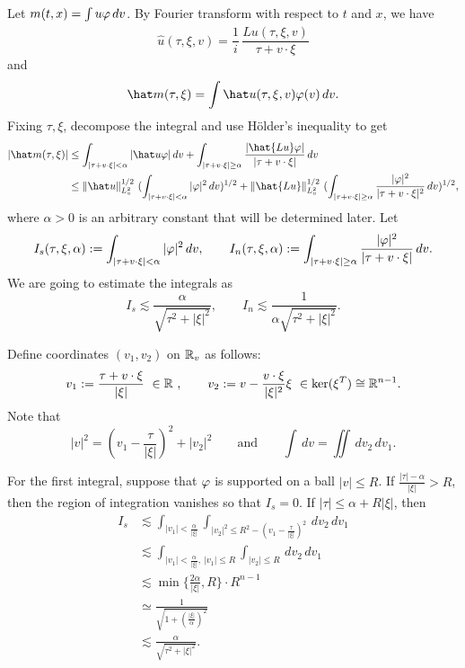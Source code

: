 \documentclass[a4paper]{article}
\begin{document}
\begin{pf}
Let $m(t,x)=\int u\varphi\,dv$.
By Fourier transform with respect to $t$ and $x$, we have
\[\hat u(\tau,\xi,v)=\frac1i\,\frac{\hat{Lu}(\tau,\xi,v)}{\tau+v\cdot\xi}\]
and
\[\hat m(\tau,\xi)=\int\hat u(\tau,\xi,v)\f(v)\,dv.\]
Fixing $\tau,\xi$, decompose the integral and use H\"older's inequality to get
\begin{align*}
|\hat m(\tau,\xi)|
&\le\int_{|\tau+v\cdot\xi|<\alpha}|\hat u\f|\,dv+\int_{|\tau+v\cdot\xi|\ge\alpha}\frac{|\hat{Lu}\f|}{|\tau+v\cdot\xi|}\,dv\\
&\le\|\hat u\|_{L_v^2}^{1/2}\ (\int_{|\tau+v\cdot\xi|<\alpha}|\f|^2\,dv)^{1/2}+\|\hat{Lu}\|_{L_v^2}^{1/2}\ (\int_{|\tau+v\cdot\xi|\ge\alpha}\frac{|\f|^2}{|\tau+v\cdot\xi|^2}\,dv)^{1/2},
\end{align*}
where $\alpha>0$ is an arbitrary constant that will be determined later.
Let
\[I_s(\tau,\xi,\alpha):=\int_{|\tau+v\cdot\xi|<\alpha}|\varphi|^2\,dv,\qquad
I_n(\tau,\xi,\alpha):=\int_{|\tau+v\cdot\xi|\ge\alpha}\frac{|\varphi|^2}{|\tau+v\cdot\xi|}\,dv.\]
We are going to estimate the integrals as
\[I_s\lesssim\frac{\alpha}{\sqrt{\tau^2+|\xi|^2}},\qquad
I_n\lesssim\frac1{\alpha\sqrt{\tau^2+|\xi|^2}}.\]

Define coordinates $(v_1,v_2)$ on $\mathbb{R}_v$ as follows:
\[v_1:=\frac{\tau+v\cdot\xi}{|\xi|}\ \in\R\ ,\qquad v_2:=v-\frac{v\cdot\xi}{|\xi|^2}\xi\ \in\ker(\xi^T)\cong\R^{n-1}.\]
Note that
\[|v|^2=(v_1-\frac\tau{|\xi|})^2+|v_2|^2\qquad\text{and}\qquad\int\,dv=\iint\,dv_2\,dv_1.\]

For the first integral, suppose that $\varphi$ is supported on a ball $|v|\le R$.
If $\frac{|\tau|-\alpha}{|\xi|}>R$, then the region of integration vanishes so that $I_s=0$.
If $|\tau|\le\alpha+R|\xi|$, then
\begin{align*}
I_s&\lesssim\int_{|v_1|<\frac\alpha{|\xi|}}\int_{|v_2|^2\le R^2-(v_1-\frac\tau{|\xi|})^2}\,dv_2\,dv_1\\
&\lesssim\int_{|v_1|<\frac\alpha{|\xi|},\ |v_1|\le R}\int_{|v_2|\le R}\,dv_2\,dv_1\\
&\lesssim\min\{\frac{2\alpha}{|\xi|},R\}\cdot R^{n-1}\\
&\simeq\frac1{\sqrt{1+(\frac{|\xi|}\alpha)^2}}\\
&\lesssim\frac\alpha{\sqrt{\tau^2+|\xi|^2}}.
\end{align*}


\end{pf}
\end{document}
